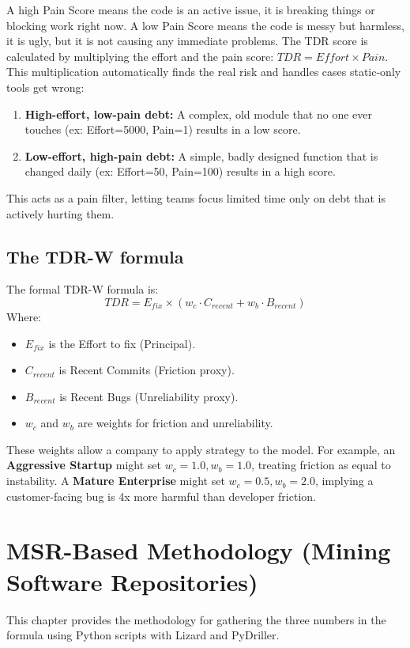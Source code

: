 \documentclass[journal]{IEEEtran}
\begin{document}
A high Pain Score means the code is an active issue, it is breaking things or blocking work right now. A low Pain Score means the code is messy but harmless, it is ugly, but it is not causing any immediate problems. The TDR score is calculated by multiplying the effort and the pain score: $TDR = Effort \times Pain$. This multiplication automatically finds the real risk and handles cases static-only tools get wrong:
\begin{enumerate}
    \item \textbf{High-effort, low-pain debt:} A complex, old module that no one ever touches (ex: Effort=5000, Pain=1) results in a low score.
    \item \textbf{Low-effort, high-pain debt:} A simple, badly designed function that is changed daily (ex: Effort=50, Pain=100) results in a high score.
\end{enumerate}
This acts as a pain filter, letting teams focus limited time only on debt that is actively hurting them.

\subsection{The TDR-W formula}
The formal TDR-W formula is:
\begin{equation}
TDR = E_{fix} \times (w_c \cdot C_{recent} + w_b \cdot B_{recent})
\label{eq1}
\end{equation}
Where:
\begin{itemize}
    \item $E_{fix}$ is the Effort to fix (Principal).
    \item $C_{recent}$ is Recent Commits (Friction proxy).
    \item $B_{recent}$ is Recent Bugs (Unreliability proxy).
    \item $w_c$ and $w_b$ are weights for friction and unreliability.
\end{itemize}

These weights allow a company to apply strategy to the model. For example, an \textbf{Aggressive Startup} might set $w_c = 1.0, w_b = 1.0$, treating friction as equal to instability. A \textbf{Mature Enterprise} might set $w_c = 0.5, w_b = 2.0$, implying a customer-facing bug is 4x more harmful than developer friction.

\section{MSR-Based Methodology (Mining Software Repositories)}
This chapter provides the methodology for gathering the three numbers in the formula using Python scripts with Lizard and PyDriller.
\end{document}
